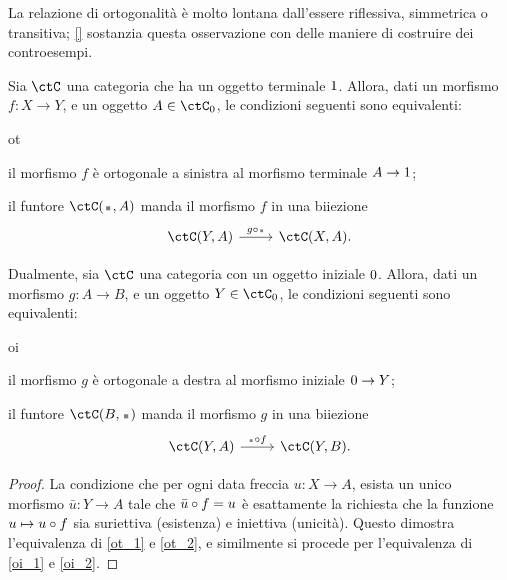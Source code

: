 La relazione di ortogonalità è molto lontana dall'essere riflessiva, simmetrica o transitiva; \ref{} sostanzia questa osservazione con delle maniere di costruire dei controesempi.
\begin{proposition}\label{ort_to_terminale}
	Sia \(\ctC\) una categoria che ha un oggetto terminale \(1\). Allora, dati un morfismo \(f : X\to Y\), e un oggetto \(A\in \ctC_0\), le condizioni seguenti sono equivalenti:
	\begin{enumtag}{ot}
		\item\label{ot_1} il morfismo \(f\) è ortogonale a sinistra al morfismo terminale \(A\to 1\);
		\item\label{ot_2} il funtore \(\Hom{\ctC}(\blank,A)\) manda il morfismo \(f\) in una biiezione
		\[\begin{tikzcd}
				\Hom{\ctC}(Y,A) \ar[r, "{g\cmp \blank}"] & \Hom{\ctC}(X,A).
			\end{tikzcd}\]
	\end{enumtag}
	Dualmente, sia \(\ctC\) una categoria con un oggetto iniziale \(0\). Allora, dati un morfismo \(g : A\to B\), e un oggetto \(Y\in\ctC_0\), le condizioni seguenti sono equivalenti:
	\begin{enumtag}{oi}
		\item \label{oi_1} il morfismo \(g\) è ortogonale a destra al morfismo iniziale \(0\to Y\);
		\item \label{oi_2} il funtore \(\Hom{\ctC}(B,\blank)\) manda il morfismo \(g\) in una biiezione
		\[\begin{tikzcd}
				\Hom{\ctC}(Y,A) \ar[r, "{\blank\cmp f}"] & \Hom{\ctC}(Y,B).
			\end{tikzcd}\]
	\end{enumtag}
\end{proposition}
\begin{proof}
	La condizione che per ogni data freccia \(u : X\to A\), esista un unico morfismo \(\bar u : Y\to A\) tale che \(\bar u\circ f = u\) è esattamente la richiesta che la funzione \(u\mapsto u\circ f\) sia suriettiva (esistenza) e iniettiva (unicità). Questo dimostra l'equivalenza di \ref{ot_1} e \ref{ot_2}, e similmente si procede per l'equivalenza di \ref{oi_1} e \ref{oi_2}.
\end{proof}
